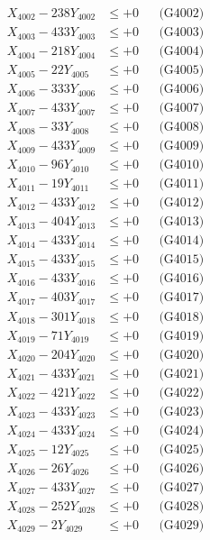 \documentclass[a4paper,10pt]{article}
\begin{document}
{\begin{align}
X_{4002} - 238Y_{4002} &\leq +0 && \text{(G4002)} \\
X_{4003} - 433Y_{4003} &\leq +0 && \text{(G4003)} \\
X_{4004} - 218Y_{4004} &\leq +0 && \text{(G4004)} \\
X_{4005} - 22Y_{4005} &\leq +0 && \text{(G4005)} \\
X_{4006} - 333Y_{4006} &\leq +0 && \text{(G4006)} \\
X_{4007} - 433Y_{4007} &\leq +0 && \text{(G4007)} \\
X_{4008} - 33Y_{4008} &\leq +0 && \text{(G4008)} \\
X_{4009} - 433Y_{4009} &\leq +0 && \text{(G4009)} \\
X_{4010} - 96Y_{4010} &\leq +0 && \text{(G4010)} \\
\allowbreak
X_{4011} - 19Y_{4011} &\leq +0 && \text{(G4011)} \\
X_{4012} - 433Y_{4012} &\leq +0 && \text{(G4012)} \\
X_{4013} - 404Y_{4013} &\leq +0 && \text{(G4013)} \\
X_{4014} - 433Y_{4014} &\leq +0 && \text{(G4014)} \\
X_{4015} - 433Y_{4015} &\leq +0 && \text{(G4015)} \\
X_{4016} - 433Y_{4016} &\leq +0 && \text{(G4016)} \\
X_{4017} - 403Y_{4017} &\leq +0 && \text{(G4017)} \\
X_{4018} - 301Y_{4018} &\leq +0 && \text{(G4018)} \\
X_{4019} - 71Y_{4019} &\leq +0 && \text{(G4019)} \\
X_{4020} - 204Y_{4020} &\leq +0 && \text{(G4020)} \\
\allowbreak
X_{4021} - 433Y_{4021} &\leq +0 && \text{(G4021)} \\
X_{4022} - 421Y_{4022} &\leq +0 && \text{(G4022)} \\
X_{4023} - 433Y_{4023} &\leq +0 && \text{(G4023)} \\
X_{4024} - 433Y_{4024} &\leq +0 && \text{(G4024)} \\
X_{4025} - 12Y_{4025} &\leq +0 && \text{(G4025)} \\
X_{4026} - 26Y_{4026} &\leq +0 && \text{(G4026)} \\
X_{4027} - 433Y_{4027} &\leq +0 && \text{(G4027)} \\
X_{4028} - 252Y_{4028} &\leq +0 && \text{(G4028)} \\
X_{4029} - 2Y_{4029} &\leq +0 && \text{(G4029)} \\

\end{align}}
\end{document}
